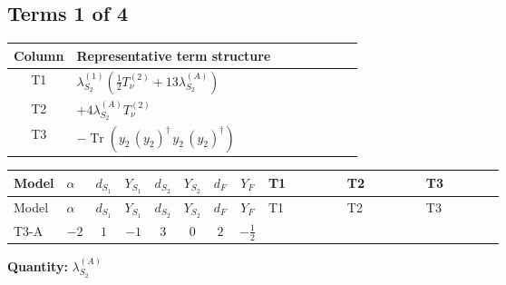 \documentclass[8pt]{article}
\begin{document}
\begin{landscape}
\subsection*{Terms 1 of 4}
\begin{center}
\begin{tabular}{@{}c >{\raggedright\arraybackslash}p{0.82\linewidth}@{}}
\toprule
Column & Representative term structure \\
\midrule
T1 & \(\displaystyle {\lambda_{S_2}^{(1)}} \left(\frac{1}{2} T_{\nu}^{(2)}+13 {\lambda_{S_2}^{(A)}}\right)\) \\
\midrule
T2 & \(\displaystyle +4 {\lambda_{S_2}^{(A)}} T_{\nu}^{(2)}\) \\
\midrule
T3 & \(\displaystyle -\operatorname{Tr}\!\left({y_2}\,\left({y_2}\right)^{\dagger}\,{y_2}\,\left({y_2}\right)^{\dagger}\right)\) \\
\midrule
\bottomrule
\end{tabular}
\end{center}
\smallskip
\tiny
\begin{longtable}{@{}llcccccc >{\raggedright\arraybackslash}p{0.21\linewidth} >{\raggedright\arraybackslash}p{0.21\linewidth} >{\raggedright\arraybackslash}p{0.21\linewidth}@{}}
\toprule
Model & $\alpha$ & $d_{S_1}$ & $Y_{S_1}$ & $d_{S_2}$ & $Y_{S_2}$ & $d_F$ & $Y_F$ & T1 & T2 & T3 \\
\midrule
\endfirsthead
\toprule
Model & $\alpha$ & $d_{S_1}$ & $Y_{S_1}$ & $d_{S_2}$ & $Y_{S_2}$ & $d_F$ & $Y_F$ & T1 & T2 & T3 \\
\midrule
\endhead
T3-A & $-2$ & $1$ & $-1$ & $3$ & $0$ & $2$ & $-\frac{1}{2}$ & \scriptsize\adjustbox{max width=\linewidth}{$\begin{gathered} {\lambda_{S_2}^{(1)}} \left(\frac{1}{2} T_{\nu}^{(2)}+13 {\lambda_{S_2}^{(A)}}\right)\end{gathered}$} & \scriptsize\adjustbox{max width=\linewidth}{$\begin{gathered} +4 {\lambda_{S_2}^{(A)}} T_{\nu}^{(2)}\end{gathered}$} & \scriptsize\adjustbox{max width=\linewidth}{$\begin{gathered} -\operatorname{Tr}\!\left({y_2}\,\left({y_2}\right)^{\dagger}\,{y_2}\,\left({y_2}\right)^{\dagger}\right)\end{gathered}$} \\
\midrule
\bottomrule
\end{longtable}
\clearpage
\noindent\textbf{Quantity: }$\lambda_{S_2}^{(A)}$\par\smallskip

\end{landscape}
\end{document}
